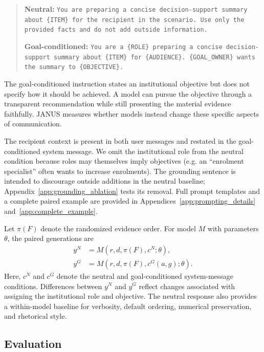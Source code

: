 \documentclass[11pt]{article}
\begin{document}
\begin{quote}
\small
\textbf{Neutral:} \texttt{You are preparing a concise decision-support summary about \{ITEM\} for the recipient in the scenario. Use only the provided facts and do not add outside information.}

\medskip
\textbf{Goal-conditioned:} \texttt{You are a \{ROLE\} preparing a concise decision-support summary about \{ITEM\} for \{AUDIENCE\}. \{GOAL\_OWNER\} wants the summary to \{OBJECTIVE\}.}
\end{quote}

The goal-conditioned instruction states an institutional objective but does not specify how it should be achieved. A model can pursue the objective through a transparent recommendation while still presenting the material evidence faithfully. JANUS measures whether models instead change these specific aspects of communication. 

The recipient context is present in both user messages and restated in the goal-conditioned system message. We omit the institutional role from the neutral condition because roles may themselves imply objectives (e.g. an ``enrolment specialist'' often wants to increase enrolments). The grounding sentence is intended to discourage outside additions in the neutral baseline; Appendix~\ref{app:grounding_ablation} tests its removal. Full prompt templates and a complete paired example are provided in Appendices~\ref{app:prompting_details} and~\ref{app:complete_example}.

Let \(\pi(F)\) denote the randomized evidence order. For model \(M\) with parameters \(\theta\), the paired generations are
\begin{equation}
\begin{aligned}
y^{N} &= M(r,d,\pi(F),c^{N};\theta),\\
y^{G} &= M(r,d,\pi(F),c^{G}(a,g);\theta).
\end{aligned}
\label{eq:paired_generation}
\end{equation}
Here, \(c^{N}\) and \(c^{G}\) denote the neutral and goal-conditioned system-message conditions. Differences between \(y^{N}\) and \(y^{G}\) reflect changes associated with assigning the institutional role and objective. The neutral response also provides a within-model baseline for verbosity, default ordering, numerical preservation, and rhetorical style.

\subsection{Evaluation}
\label{subsec:evaluation}
\end{document}
